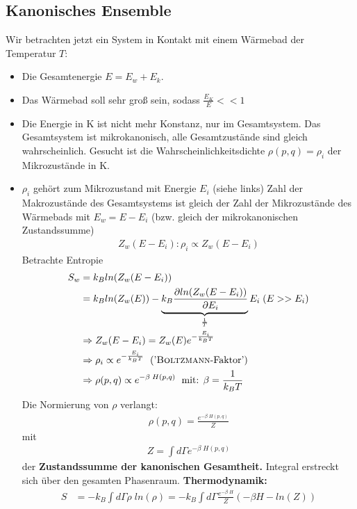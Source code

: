 \documentclass[12pt]{article}
\begin{document}
\subsection{Kanonisches Ensemble}
Wir betrachten jetzt ein System in Kontakt mit einem Wärmebad der Temperatur $T$: \\
\begin{itemize}
\item Die Gesamtenergie $E = E_w + E_k$. \\
\item Das Wärmebad soll sehr groß sein, sodass $\frac{E_K}{E} << 1$
\item Die Energie in K ist nicht mehr Konstanz, nur im Gesamtsystem. Das Gesamtsystem ist mikrokanonisch, alle Gesamtzustände sind gleich wahrscheinlich. Gesucht ist die Wahrscheinlichkeitsdichte $\rho (p,q) = \rho_i $ der Mikrozustände in K. 
\item $\rho_i$ gehört zum Mikrozustand mit Energie $E_i$ (siehe links) %
Zahl der Makrozustände des Gesamtsystems ist gleich der Zahl der Mikrozustände des Wärmebads mit $E_w = E - E_i$ (bzw. gleich der mikrokanonischen Zustandssumme) 
\begin{align}
Z_w (E- E_i): \rho_i \propto Z_w (E-E_i)
\end{align}
Betrachte Entropie
\begin{align}
S_w &= k_B ln (Z_w (E-E_i)) \\
&= k_B ln (Z_w (E)) - \underbrace{ k_B \frac{\partial ln (Z_w (E-E_i))}{\partial E_i}}_{ \frac{1}{T}} E_i \; ( E >> E_i) \\
& \Rightarrow Z_w (E-E_i) = Z_w (E) e^{-\frac{E_i}{k_B T}} \\
&\Rightarrow \rho_i \propto e^{- \frac{E_i}{k_B T} } \; \mbox{  ('\textsc{Boltzmann}-Faktor')} \\
&\Rightarrow \rho (p,q) \propto e^{- \beta \; H(p,q)} \; \mbox{ mit: } \beta = \frac{1}{k_B T}
\end{align}
Die Normierung von $\rho$ verlangt: 
\begin{align}
\rho (p,q) = \frac{e^{- \beta \; H(p,q)}}{Z}
\end{align}
mit
\begin{align}
Z = \int d \Gamma e^{- \beta \; H(p,q)}
\end{align}
der \textbf{Zustandssumme der kanonischen Gesamtheit.} Integral erstreckt sich über den gesamten Phasenraum. \textbf{Thermodynamik:}
\begin{align}
S &= -k_B \int d\Gamma \rho \; ln(\rho ) = -k_B \int d\Gamma \frac{e^{- \beta \; H}}{Z} (- \beta H - ln(Z)) \\

\end{align}
\end{itemize}
\end{document}
